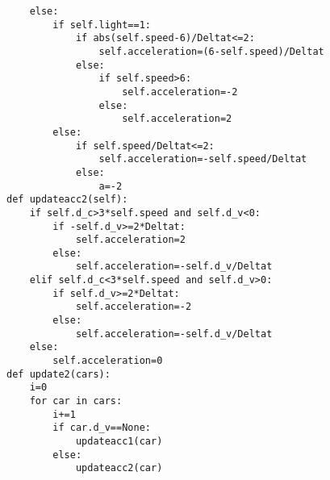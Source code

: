 \documentclass[a4paper,12pt]{article}
\numberwithin{equation}{section}
\begin{document}
\begin{appendix}
\begin{lstlisting}
    else:
        if self.light==1:
            if abs(self.speed-6)/Deltat<=2:
                self.acceleration=(6-self.speed)/Deltat
            else:
                if self.speed>6:
                    self.acceleration=-2
                else:
                    self.acceleration=2
        else:
            if self.speed/Deltat<=2:
                self.acceleration=-self.speed/Deltat
            else:
                a=-2
def updateacc2(self):
    if self.d_c>3*self.speed and self.d_v<0:
        if -self.d_v>=2*Deltat:
            self.acceleration=2
        else:
            self.acceleration=-self.d_v/Deltat
    elif self.d_c<3*self.speed and self.d_v>0:
        if self.d_v>=2*Deltat:
            self.acceleration=-2
        else:
            self.acceleration=-self.d_v/Deltat
    else:
        self.acceleration=0
def update2(cars):
    i=0
    for car in cars:
        i+=1
        if car.d_v==None:
            updateacc1(car)
        else:
            updateacc2(car)
            

\end{lstlisting}
\end{appendix}
\end{document}
